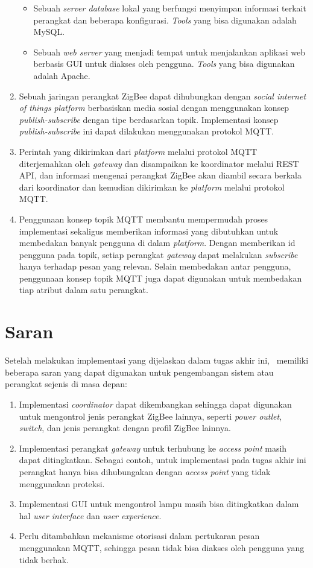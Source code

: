 \begin{enumerate}
\begin{itemize}
	\item Sebuah \textit{server database} lokal yang berfungsi menyimpan informasi terkait perangkat dan beberapa konfigurasi. \textit{Tools} yang bisa digunakan adalah MySQL.
	\item Sebuah \textit{web server} yang menjadi tempat untuk menjalankan aplikasi web berbasis GUI untuk diakses oleh pengguna. \textit{Tools} yang bisa digunakan adalah Apache.
	\end{itemize}
	
	\item Sebuah jaringan perangkat ZigBee dapat dihubungkan dengan \textit{social internet of things platform} berbasiskan media sosial dengan menggunakan konsep \textit{publish-subscribe} dengan tipe berdasarkan topik. Implementasi konsep \textit{publish-subscribe} ini dapat dilakukan menggunakan protokol MQTT.
	
	\item Perintah yang dikirimkan dari \textit{platform} melalui protokol MQTT diterjemahkan oleh \textit{gateway} dan disampaikan ke koordinator melalui REST API, dan informasi mengenai perangkat ZigBee akan diambil secara berkala dari koordinator dan kemudian dikirimkan ke \textit{platform} melalui protokol MQTT.
	
	\item Penggunaan konsep topik MQTT membantu mempermudah proses implementasi sekaligus memberikan informasi yang dibutuhkan untuk membedakan banyak pengguna di dalam \textit{platform}. Dengan memberikan id pengguna pada topik, setiap perangkat \textit{gateway} dapat melakukan \textit{subscribe} hanya terhadap pesan yang relevan. Selain membedakan antar pengguna, penggunaan konsep topik MQTT juga dapat digunakan untuk membedakan tiap atribut dalam satu perangkat.
\end{enumerate}

\section{Saran}
Setelah melakukan implementasi yang dijelaskan dalam tugas akhir ini, \saya~memiliki beberapa saran yang dapat digunakan untuk pengembangan sistem atau perangkat sejenis di masa depan:
\begin{enumerate}
	\item Implementasi \textit{coordinator} dapat dikembangkan sehingga dapat digunakan untuk mengontrol jenis perangkat ZigBee lainnya, seperti \textit{power outlet}, \textit{switch}, dan jenis perangkat dengan profil ZigBee lainnya.
	\item Implementasi perangkat \textit{gateway} untuk terhubung ke \textit{access point} masih dapat ditingkatkan. Sebagai contoh, untuk implementasi pada tugas akhir ini perangkat hanya bisa dihubungakan dengan \textit{access point} yang tidak menggunakan proteksi.
	\item Implementasi GUI untuk mengontrol lampu masih bisa ditingkatkan dalam hal \textit{user interface} dan \textit{user experience}.
	\item Perlu ditambahkan mekanisme otorisasi dalam pertukaran pesan menggunakan MQTT, sehingga pesan tidak bisa diakses oleh pengguna yang tidak berhak.
\end{enumerate}

